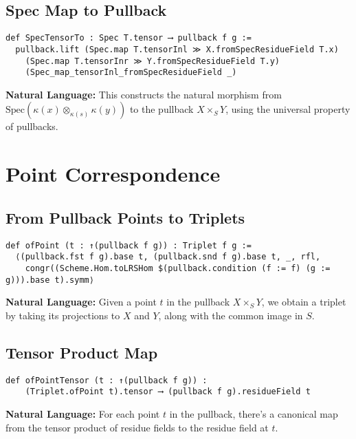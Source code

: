 \documentclass{article}
\theoremstyle{definition}
\begin{document}
\subsection{Spec Map to Pullback}

\begin{lstlisting}
def SpecTensorTo : Spec T.tensor ⟶ pullback f g :=
  pullback.lift (Spec.map T.tensorInl ≫ X.fromSpecResidueField T.x)
    (Spec.map T.tensorInr ≫ Y.fromSpecResidueField T.y)
    (Spec_map_tensorInl_fromSpecResidueField _)
\end{lstlisting}

\textbf{Natural Language:} This constructs the natural morphism from $\mathrm{Spec}(\kappa(x) \otimes_{\kappa(s)} \kappa(y))$ to the pullback $X \times_S Y$, using the universal property of pullbacks.

\section{Point Correspondence}

\subsection{From Pullback Points to Triplets}

\begin{lstlisting}
def ofPoint (t : ↑(pullback f g)) : Triplet f g :=
  ⟨(pullback.fst f g).base t, (pullback.snd f g).base t, _, rfl,
    congr((Scheme.Hom.toLRSHom $(pullback.condition (f := f) (g := g))).base t).symm⟩
\end{lstlisting}

\textbf{Natural Language:} Given a point $t$ in the pullback $X \times_S Y$, we obtain a triplet by taking its projections to $X$ and $Y$, along with the common image in $S$.

\subsection{Tensor Product Map}

\begin{lstlisting}
def ofPointTensor (t : ↑(pullback f g)) :
    (Triplet.ofPoint t).tensor ⟶ (pullback f g).residueField t
\end{lstlisting}

\textbf{Natural Language:} For each point $t$ in the pullback, there's a canonical map from the tensor product of residue fields to the residue field at $t$.
\end{document}

